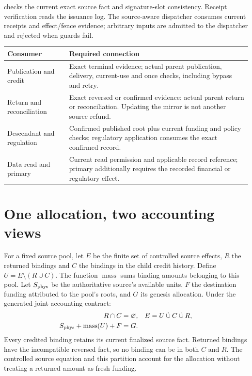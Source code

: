 \documentclass[10pt,a4paper]{article}
\newcommand{\code}[1]{\texttt{\detokenize{#1}}}
\begin{document}
\code{issue_source_receipt} checks the current exact source fact and
signature-slot consistency. Receipt verification reads the issuance log.
The source-aware dispatcher consumes current receipts and effect/fence evidence;
arbitrary inputs are admitted to the dispatcher and rejected when guards fail.

{\small
\begin{tabularx}{\textwidth}{@{}L{0.25\textwidth}Y@{}}
\toprule
Consumer & Required connection \\
\midrule
Publication and credit & Exact terminal evidence; actual parent publication,
  delivery, current-use and once checks, including bypass and retry. \\
Return and reconciliation & Exact reversed or confirmed evidence; actual parent
  return or reconciliation. Updating the mirror is not another source refund. \\
Descendant and regulation & Confirmed published root plus current funding and
  policy checks; regulatory application consumes the exact confirmed record. \\
Data read and primary & Current read permission and applicable record reference;
  primary additionally requires the recorded financial or regulatory effect. \\
\bottomrule
\end{tabularx}}

\clearpage
\section*{One allocation, two accounting views}
For a fixed source pool, let $E$ be the finite set of controlled source effects,
$R$ the returned bindings and $C$ the bindings in the child credit history.
Define $U=E\setminus(R\cup C)$. The function $\operatorname{mass}$ sums binding
amounts belonging to this pool. Let $S_{\rm phys}$ be the authoritative source's
available units, $F$ the destination funding attributed to the pool's roots,
and $G$ its genesis allocation. Under the generated joint accounting contract:
\begin{align*}
 R\cap C&=\varnothing, & E&=U\mathbin{\dot\cup}C\mathbin{\dot\cup}R,\\
 S_{\rm phys}+\operatorname{mass}(U)+F&=G.
\end{align*}
Every credited binding retains its current finalized source fact. Returned
bindings have the incompatible reversed fact, so no binding can be in both
$C$ and $R$. The controlled source equation and this partition account for
the allocation without treating a returned amount as fresh funding.
\end{document}
